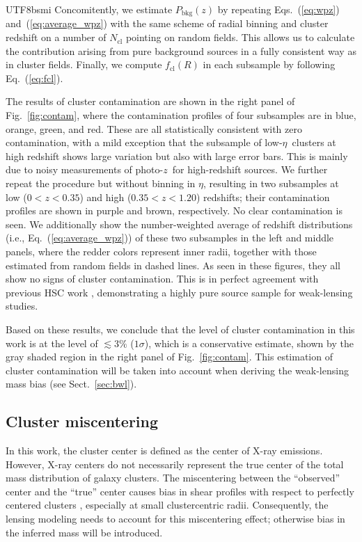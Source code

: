 \documentclass[longauth]{aa}
\newcommand{\redshift}{\ensuremath{z}}
\newcommand{\fcl}{\ensuremath{f_{\mathrm{cl}}}}
\newcommand{\rate}{\ensuremath{\eta}}
\newcommand{\percent}{\ensuremath{\%}}
\begin{document}
\begin{CJK*}{UTF8}{bsmi}
Concomitently, we estimate $P_{\mathrm{bkg}}\left(\redshift\right)$ 
by repeating Eqs.~(\ref{eq:wpz}) and~(\ref{eq:average_wpz}) with the same scheme of radial binning and cluster redshift on a number of $N_{\mathrm{cl}}$ pointing on random fields.
This allows us to calculate the contribution arising from pure background sources in a fully consistent way as in cluster fields.
Finally, we compute $\fcl\left(R\right)$ in each subsample by following Eq.~(\ref{eq:fcl}).


The results of cluster contamination are shown in the right panel of Fig.~\ref{fig:contam}, where the contamination profiles of four subsamples are in blue, orange, green, and red.
These are all statistically consistent with zero contamination, with a mild exception that the subsample of low-\rate\ clusters at high redshift shows large variation but also with large error bars.
This is mainly due to noisy measurements of photo-\redshift\ for high-redshift sources.
We further repeat the procedure but without binning in \rate, resulting in two subsamples at low ($0<\redshift<0.35$) and high ($0.35<\redshift<1.20$) redshifts; their contamination profiles are shown in purple and brown, respectively.
No clear contamination is seen.
We additionally show the number-weighted average of redshift distributions (i.e., Eq.~(\ref{eq:average_wpz})) of these two subsamples in the left and middle panels, where the redder colors represent inner radii, together with those estimated from random fields in dashed lines.
As seen in these figures, they all show no signs of cluster contamination.
This is in perfect agreement with previous HSC work \citep{medezinski18a,medezinski18b,miyatake19,umetsu20}, demonstrating a highly pure source sample for weak-lensing studies.


Based on these results, we conclude that the level of cluster contamination in this work is at the level of $\lesssim3\percent$ ($1\sigma$), which is a conservative estimate, shown by the gray shaded region in the right panel of Fig.~\ref{fig:contam}.
This estimation of cluster contamination will be taken into account when deriving the weak-lensing mass bias (see Sect.~\ref{sec:bwl}).





\subsection{Cluster miscentering}
\label{sec:miscentering}

In this work, the cluster center is defined as the center of X-ray emissions.
However, X-ray centers
do not necessarily represent the true center of the total mass distribution of galaxy clusters.
The miscentering between the ``observed'' center and the ``true'' center causes bias in shear profiles with respect to perfectly centered clusters \citep{johnston07a,johnston07b}, especially at small clustercentric radii.
Consequently, the lensing modeling needs to account for this miscentering effect; otherwise bias in the inferred mass will be introduced.


\end{CJK*}
\end{document}
